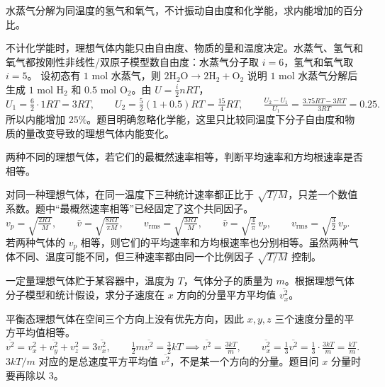 \documentclass[lang=cn,11pt]{elegantbook}
\begin{document}
\begin{exercise}[水蒸气分解为同温氢气和氧气时内能增加多少]
水蒸气分解为同温度的氢气和氧气，不计振动自由度和化学能，求内能增加的百分比。
\end{exercise}

\begin{solution}
不计化学能时，理想气体内能只由自由度、物质的量和温度决定。水蒸气、氢气和氧气都按刚性非线性/双原子模型数自由度：水蒸气分子取 \(i=6\)，氢气和氧气取 \(i=5\)。
设初态有 \(1\) mol 水蒸气，则
 \(2\mathrm{H_2O}\rightarrow 2\mathrm{H_2}+\mathrm{O_2}\) 
说明 \(1\) mol 水蒸气分解后生成 \(1\) mol \(\mathrm{H_2}\) 和 \(0.5\) mol \(\mathrm{O_2}\)。由 \(U=\frac{i}{2}nRT\)，
 \(U_1=\frac{6}{2}\cdot1RT=3RT,\qquad U_2=\frac{5}{2}(1+0.5)RT=\frac{15}{4}RT,\qquad \frac{U_2-U_1}{U_1} =\frac{3.75RT-3RT}{3RT} =0.25.\) 
所以内能增加 \(25\%\)。题目明确忽略化学能，这里只比较同温度下分子自由度和物质的量改变导致的理想气体内能变化。
\end{solution}

\begin{exercise}[最概然速率相等时三种统计速率是否相等]
两种不同的理想气体，若它们的最概然速率相等，判断平均速率和方均根速率是否相等。
\end{exercise}

\begin{solution}
对同一种理想气体，在同一温度下三种统计速率都正比于 \(\sqrt{T/M}\)，只差一个数值系数。题中“最概然速率相等”已经固定了这个共同因子。
 \(v_p=\sqrt{\frac{2RT}{M}},\qquad \bar v=\sqrt{\frac{8RT}{\pi M}},\qquad v_{\mathrm{rms}}=\sqrt{\frac{3RT}{M}},\qquad \bar v=\sqrt{\frac{4}{\pi}}\,v_p,\qquad v_{\mathrm{rms}}=\sqrt{\frac{3}{2}}\,v_p.\) 
若两种气体的 \(v_p\) 相等，则它们的平均速率和方均根速率也分别相等。虽然两种气体不同、温度可能不同，但三种速率都由同一个比例因子 \(\sqrt{T/M}\) 控制。
\end{solution}

\begin{exercise}
一定量理想气体贮于某容器中，温度为 \(T\)，气体分子的质量为 \(m\)。根据理想气体分子模型和统计假设，求分子速度在 \(x\) 方向的分量平方平均值 \(\overline{v_x^2}\)。
\end{exercise}

\begin{solution}
平衡态理想气体在空间三个方向上没有优先方向，因此 \(x,y,z\) 三个速度分量的平方平均值相等。
 \(\overline{v^2} =\overline{v_x^2+v_y^2+v_z^2} =3\overline{v_x^2},\qquad \frac12m\overline{v^2}=\frac32kT \implies \overline{v^2}=\frac{3kT}{m},\qquad \overline{v_x^2} =\frac13\overline{v^2} =\frac13\cdot\frac{3kT}{m} =\frac{kT}{m}.\) 
\(3kT/m\) 对应的是总速度平方平均值 \(\overline{v^2}\)，不是某一个方向的分量。题目问 \(x\) 分量时要再除以 \(3\)。
\end{solution}
\end{document}
